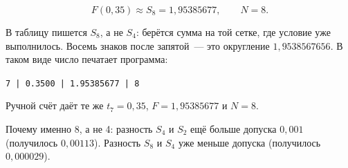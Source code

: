 \documentclass[11pt,a4paper]{article}
\begin{document}
\[
F(0{,}35) \approx S_{8} = 1{,}95385677, \qquad N = 8.
\]

В таблицу пишется \(S_{8}\), а не \(S_{4}\): берётся сумма на той сетке, где условие уже выполнилось.
Восемь знаков после запятой~--- это округление \(1{,}9538567656\). В таком виде число печатает программа:

\begin{center}
\texttt{7 | 0.3500 | 1.95385677 | 8}
\end{center}

Ручной счёт даёт те же \(t_{7} = 0{,}35\), \(F = 1{,}95385677\) и \(N = 8\).

Почему именно 8, а не 4: разность \(S_{4}\) и \(S_{2}\) ещё больше допуска \(0{,}001\)
(получилось \(0{,}00113\)). Разность \(S_{8}\) и \(S_{4}\) уже меньше допуска
(получилось \(0{,}000029\)).
\end{document}
